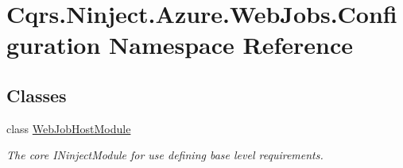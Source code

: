 \hypertarget{namespaceCqrs_1_1Ninject_1_1Azure_1_1WebJobs_1_1Configuration}{}\section{Cqrs.\+Ninject.\+Azure.\+Web\+Jobs.\+Configuration Namespace Reference}
\label{namespaceCqrs_1_1Ninject_1_1Azure_1_1WebJobs_1_1Configuration}
\subsection*{Classes}
\begin{DoxyCompactItemize}
\item 
class \hyperlink{classCqrs_1_1Ninject_1_1Azure_1_1WebJobs_1_1Configuration_1_1WebJobHostModule}{Web\+Job\+Host\+Module}
\begin{DoxyCompactList}\small\item\em The core I\+Ninject\+Module for use defining base level requirements. \end{DoxyCompactList}\end{DoxyCompactItemize}

